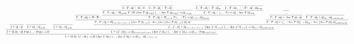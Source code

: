 \documentclass[11pt, twoside, reqno]{book}
\begin{document}
\begin{landscape}
\begin{displaymath}
\scalebox{0.4}{
\prftree{
  \prftree
    {\prftree{\Gamma \vdash \Pi : \Xi}}
    {\prftree{\Gamma \vdash \mathcal{U_i} : \mathcal{U_{i+1}}}}
    {\Gamma \vdash \Pi\ \mathcal{U_i} : \Pi\ \text{Fun}\ (\_ : \text{Fun}) \to \mathcal{U}}
}{
  \prftree
  {\prftree{\Gamma \vdash \mathcal{U_i} : \mathcal{U_{i+1}}}}
  {\prftree
    {\prftree
      {\prftree{\Gamma,\ T : \mathcal{U_i} \vdash \Pi : \Xi}}
      {\prftree
        {\prftree
          {\prftree{\Gamma,\ T : \mathcal{U_i} \vdash \Pi : \Xi}}
          {\prftree{\Gamma,\ T : \mathcal{U_i} \vdash T : \mathcal{U_i}}}
          {\Gamma,\ T : \mathcal{U_i} \vdash \Pi_{i,o+2}\ T : \Pi\ (\text{Arr}\ T\ \mathcal{U_{o+1}})\ (\_ : \text{Arr}\ T\ \mathcal{U_{o+1}}) \to \mathcal{U_{i\lor o+2}}}
        }
        {\prftree
          {\prftree{\Gamma,\ T : \mathcal{U_i} \vdash T : \mathcal{U_1}}}
          {\prftree{\Gamma,\ T : \mathcal{U_i},\ \_ : T \vdash \mathcal{U_o} : \mathcal{U_{o+1}}}}
          {\Gamma,\ T : \mathcal{U_i} \vdash (\_ : T) \to \mathcal{U_o} : \text{Arr}\ T\ \mathcal{U_{o+1}}}
        }
        {\Gamma,\ T : \mathcal{U_i} \vdash \Pi_{i,o+2}\ T\ (\_ : T) \to \mathcal{U_{o+1}} : \mathcal{U_{i\lor o+2}}}
      }
      {\Gamma,\ T : \mathcal{U_i} \vdash \Pi_{i\lor o+2, i+1\lor o+1}\ (\text{Arr}\ T\ \mathcal{U_{o+1}}) : \text{Arr}\ (\text{Arr}\ (\text{Arr}\ T\ \mathcal{U_{o+1}})\ \mathcal{U})\ \mathcal{U}}
    }
    {\prftree
      {\prftree
        {\prftree{\dots}}
        {\Gamma,\ T : \mathcal{U_i} \vdash \text{Arr}\ T\ \mathcal{U} : \mathcal{U}}
      }
      {\prftree{\Gamma,\ T : \mathcal{U_i} \vdash \mathcal{U_{i\lor o}} : \mathcal{U_{i+1\lor o+1}}}}
      {\Gamma,\ T : \mathcal{U_i} \vdash (\_ : \text{Arr}\ T\ \mathcal{U}) \to \mathcal{U_{i\lor o}} : \text{Arr}\ (\text{Arr}\ T\ \mathcal{U})\ \mathcal{U_{i+1\lor o+1}}}
    }
    {\Gamma,\ T : \mathcal{U_i} \vdash \Pi_{i\lor o+1, i+1\lor o+1}\ (\text{Arr}\ T\ \mathcal{U_{o+1}})\ (\_ : \text{Arr}\ T\ \mathcal{U_{o+1}}) \to \mathcal{U_{i\lor o}} : \mathcal{U_{i+1\lor o+1}}}
  }
  {\Gamma \vdash (T : \mathcal{U_i}) \to \Pi_{i\lor o+1, i+1\lor o+1}\ (\text{Arr}\ T\ \mathcal{U}_o)\ (\_ : \text{Arr}\ T\ \mathcal{U}_o) \to \mathcal{U_{i\lor o}} : \text{Fun}_{i, i+1\lor o+1}}
}{\Gamma \vdash \Pi\ \mathcal{U_i}\ (T : \mathcal{U_i}) \to \Pi\ (\text{Arr}\ T\ \mathcal{U}_o)\ (\_ : \text{Arr}\ T\ \mathcal{U}_o) \to \mathcal{U_{i\lor o}} : \mathcal{U_{i+1 \lor o+1}}}
}
\end{displaymath}
\end{landscape}
\end{document}
